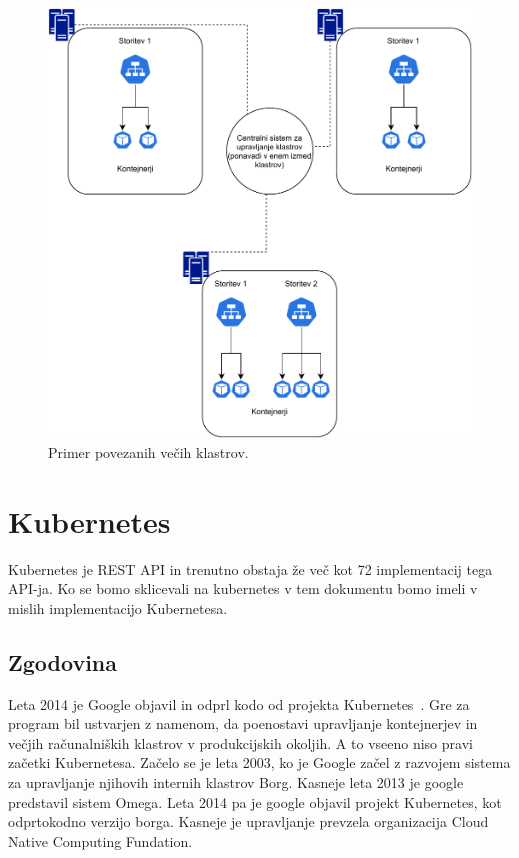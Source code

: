 \documentclass[a4paper, 12pt]{book}
\begin{document}
\begin{figure}[h]
\begin{center}
\includegraphics[width=1.0\textwidth]{images/primer-povezanih-klastrov.pdf}
\end{center}
\caption{Primer povezanih večih klastrov.}
\label{problem-povezanih-klastrov}
\end{figure}

\chapter{Kubernetes}
\label{kubernetes}
Kubernetes je REST API in trenutno obstaja že več kot 72 implementacij tega API-ja. Ko se bomo sklicevali na kubernetes v tem dokumentu bomo imeli v mislih implementacijo Kubernetesa.
\section{Zgodovina}
Leta 2014 je Google objavil in odprl kodo od projekta Kubernetes~\cite{what-is-kubernetes}.
Gre za program bil ustvarjen z namenom, da poenostavi upravljanje kontejnerjev in večjih računalniških klastrov v produkcijskih okoljih.
A to vseeno niso pravi začetki Kubernetesa.
Začelo se je leta 2003, ko je Google začel z razvojem sistema za upravljanje njihovih internih klastrov Borg.
Kasneje leta 2013 je google predstavil sistem Omega.
Leta 2014 pa je google objavil projekt Kubernetes, kot odprtokodno verzijo borga.
Kasneje je upravljanje prevzela organizacija Cloud Native Computing Fundation.
\end{document}
